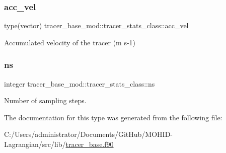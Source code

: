 \subsubsection{\texorpdfstring{acc\+\_\+vel}{acc\_vel}}
{\footnotesize\ttfamily type(vector) tracer\+\_\+base\+\_\+mod\+::tracer\+\_\+stats\+\_\+class\+::acc\+\_\+vel\hspace{0.3cm}{\ttfamily [private]}}



Accumulated velocity of the tracer (m s-\/1) 

\mbox{\label{structtracer__base__mod_1_1tracer__stats__class_a5e01cdc2592ecf31711151cf54e3b4d5}} 
\subsubsection{\texorpdfstring{ns}{ns}}
{\footnotesize\ttfamily integer tracer\+\_\+base\+\_\+mod\+::tracer\+\_\+stats\+\_\+class\+::ns\hspace{0.3cm}{\ttfamily [private]}}



Number of sampling steps. 



The documentation for this type was generated from the following file\+:\begin{DoxyCompactItemize}
\item 
C\+:/\+Users/administrator/\+Documents/\+Git\+Hub/\+M\+O\+H\+I\+D-\/\+Lagrangian/src/lib/\hyperlink{tracer__base_8f90}{tracer\+\_\+base.\+f90}\end{DoxyCompactItemize}
